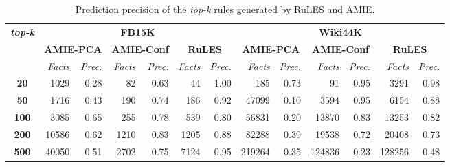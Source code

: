 \setlength{\tabcolsep}{0.1em}
\begin{table}[t]
\centering
\begin{tabular}{|c|r r|r r|r r|r r|r r|r r|}
 \hline
 \multirow{3}{*}{\textbf{\textit{top-k}}}&\multicolumn{6}{|c|}{\textbf{FB15K}} & \multicolumn{6}{|c|}{\textbf{Wiki44K}}\\
 \cline{2-13}&\multicolumn{2}{|c|}{\textbf{AMIE-PCA}}&\multicolumn{2}{|c|}{\textbf{AMIE-Conf}}&\multicolumn{2}{|c|}{\textbf{RuLES}}&\multicolumn{2}{|c|}{\textbf{AMIE-PCA}}&\multicolumn{2}{|c|}{\textbf{AMIE-Conf}}&\multicolumn{2}{|c|}{\textbf{RuLES}} \\
 & \textit{Facts} & \textit{Prec.} & \textit{Facts} & \textit{Prec.} & \textit{Facts} & \textit{Prec.} &\textit{Facts} & \textit{Prec.} &\textit{Facts} & \textit{Prec.} &\textit{Facts} & \textit{Prec.} \\
 \hline
 \textbf{20} & 1029 & 0.28 & 82 & 0.63 & 44 & 1.00 & 185 & 0.73 & 91 & 0.95 & 3291 & 0.98\\
 \textbf{50} & 1716 & 0.43 & 190 & 0.74 & 186 & 0.92 & 47099 & 0.10 & 3594 & 0.95 & 6154 & 0.88 \\
\textbf{100} & 3085 & 0.65 & 255 & 0.78 & 539 & 0.80 & 56831 & 0.20 & 13870 & 0.83 & 13253 & 0.82 \\
\textbf{200} & 10586 & 0.62 & 1210 & 0.83 & 1205 & 0.88 & 82288 & 0.39 & 19538 & 0.72 & 20408 & 0.73 \\
\textbf{500} & 40050 & 0.51 & 2702 & 0.75 & 7124 & 0.95 & 219264 & 0.35 & 124836 & 0.23 & 128256 & 0.48 \\
 \hline
\end{tabular}
\caption{Prediction precision of the \textit{top-k} rules generated by RuLES and AMIE.}
\label{table:amie_vs_RuLES}
\end{table}
\setlength{\tabcolsep}{0.2em}

